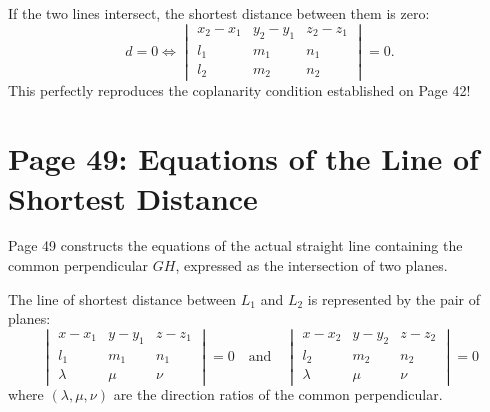 \begin{notebox}[Intersection as a Degenerate Case ($d = 0$)]
If the two lines intersect, the shortest distance between them is zero:
\begin{equation}
    d = 0 \iff \begin{vmatrix}
    x_2 - x_1 & y_2 - y_1 & z_2 - z_1 \\
    l_1 & m_1 & n_1 \\
    l_2 & m_2 & n_2
    \end{vmatrix} = 0.
\end{equation}
This perfectly reproduces the coplanarity condition established on Page 42!
\end{notebox}

\section{Page 49: Equations of the Line of Shortest Distance}
\label{sec:page49}

\begin{conceptbox}
Page 49 constructs the equations of the actual straight line containing the common perpendicular $GH$, expressed as the intersection of two planes.
\end{conceptbox}

\begin{theorembox}
The line of shortest distance between $L_1$ and $L_2$ is represented by the pair of planes:
\begin{equation}
    \boxed{\begin{vmatrix}
    x - x_1 & y - y_1 & z - z_1 \\
    l_1 & m_1 & n_1 \\
    \lambda & \mu & \nu
    \end{vmatrix} = 0 \quad \text{and} \quad
    \begin{vmatrix}
    x - x_2 & y - y_2 & z - z_2 \\
    l_2 & m_2 & n_2 \\
    \lambda & \mu & \nu
    \end{vmatrix} = 0}
\end{equation}
where $(\lambda, \mu, \nu)$ are the direction ratios of the common perpendicular.
\end{theorembox}

